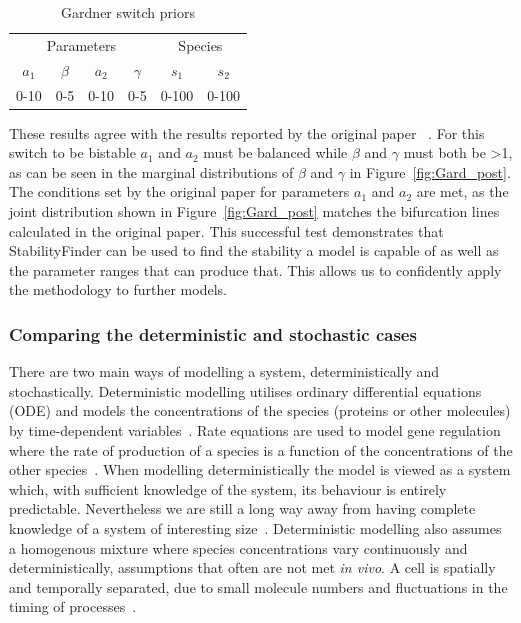 \begin{table}[b]
\centering
\caption{Gardner switch priors}
\label{tab:gard}
\begin{tabular}{cccc|cc}
\multicolumn{4}{c|}{Parameters} & \multicolumn{2}{c}{Species} \\ %
$a_1$   & $\beta$   & $a_2$   & $\gamma$  &   $s_1$      &       $s_2$   \\
0-10    & 0-5       & 0-10    &  0-5      &      0-100   &          0-100   
\end{tabular}
\end{table}

These results agree with the results reported by the original paper~\autocite{Gardner:2000vha} . For this switch to be bistable $a_1$ and $a_2$ must be balanced while $\beta$ and $\gamma$ must both be \textgreater 1, as can be seen in the marginal distributions of $\beta$ and $\gamma$ in Figure~\ref{fig:Gard_post}. The conditions set by the original paper for parameters $a_1$ and $a_2$ are met, as the joint distribution shown in Figure~\ref{fig:Gard_post} matches the bifurcation lines calculated in the original paper. 
This successful test demonstrates that StabilityFinder can be used to find the stability a model is capable of as well as the parameter ranges that can produce that. This allows us to confidently apply the methodology to further models.

\subsubsection{Comparing the deterministic and stochastic cases} 
    
There are two main ways of modelling a system, deterministically and stochastically. Deterministic modelling utilises ordinary differential equations (ODE) and models the concentrations of the species (proteins or other molecules) by time-dependent variables~\autocite{deJong:2002ft}. Rate equations are used to model gene regulation where the rate of production of a species is a function of the concentrations of the other species~\autocite{deJong:2002ft}. When modelling deterministically the model is viewed as a system which, with sufficient knowledge of the system, its behaviour is entirely predictable. Nevertheless we are still a long way away from having complete knowledge of a system of interesting size~\autocite{wilkinson:2006}. Deterministic modelling also assumes a homogenous mixture where species concentrations vary continuously and deterministically, assumptions that often are not met \textit{in vivo}. A cell is spatially and temporally separated, due to small molecule numbers and fluctuations in the timing of processes~\autocite{deJong:2002ft}.  
   
